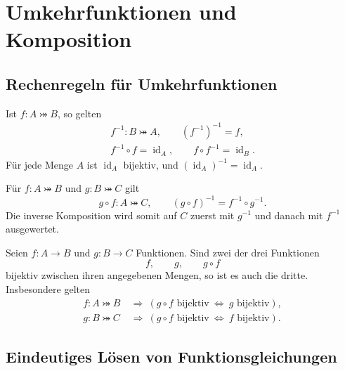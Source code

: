 \chapter{Umkehrfunktionen und Komposition}
\label{b08guide:ch:inverses}

\section{Rechenregeln für Umkehrfunktionen}

\begin{theorem}
\label{b08guide:thm:inverselaws}
Ist $f\colon A\bij B$, so gelten
\[
 \begin{gathered}
 f^{-1}\colon B\bij A,\qquad (f^{-1})^{-1}=f,\\
 f^{-1}\circ f=\operatorname{id}_A,
 \qquad f\circ f^{-1}=\operatorname{id}_B.
 \end{gathered}
\]
Für jede Menge $A$ ist $\operatorname{id}_A$ bijektiv, und
$(\operatorname{id}_A)^{-1}=\operatorname{id}_A$.
\end{theorem}

\begin{theorem}
\label{b08guide:thm:composition}
Für $f\colon A\bij B$ und $g\colon B\bij C$ gilt
\[
 g\circ f\colon A\bij C,
 \qquad (g\circ f)^{-1}=f^{-1}\circ g^{-1}.
\]
Die inverse Komposition wird somit auf $C$ zuerst mit $g^{-1}$
und danach mit $f^{-1}$ ausgewertet.
\end{theorem}

\begin{theorem}
\label{b08guide:thm:twoofthree}
Seien $f\colon A\to B$ und $g\colon B\to C$ Funktionen.
Sind zwei der drei Funktionen
\[
 f,\qquad g,\qquad g\circ f
\]
bijektiv zwischen ihren angegebenen Mengen, so ist es auch die dritte.
Insbesondere gelten
\[
 \begin{aligned}
 f\colon A\bij B&\ \Longrightarrow\
 (g\circ f\text{ bijektiv}\ \Longleftrightarrow\ g\text{ bijektiv}),\\
 g\colon B\bij C&\ \Longrightarrow\
 (g\circ f\text{ bijektiv}\ \Longleftrightarrow\ f\text{ bijektiv}).
 \end{aligned}
\]
\end{theorem}

\section{Eindeutiges Lösen von Funktionsgleichungen}

